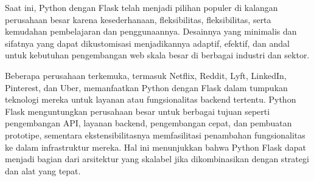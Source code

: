 \documentclass{article}
\begin{document}
Saat ini, Python dengan Flask telah menjadi pilihan populer di kalangan perusahaan besar karena kesederhanaan, fleksibilitas, fleksibilitas, serta kemudahan pembelajaran dan penggunaannya. Desainnya yang minimalis dan sifatnya yang dapat dikustomisasi menjadikannya adaptif, efektif, dan andal untuk kebutuhan pengembangan web skala besar di berbagai industri dan sektor.

Beberapa perusahaan terkemuka, termasuk Netflix, Reddit, Lyft, LinkedIn, Pinterest, dan Uber, memanfaatkan Python dengan Flask dalam tumpukan teknologi mereka untuk layanan atau fungsionalitas backend tertentu. Python Flask menguntungkan perusahaan besar untuk berbagai tujuan seperti pengembangan API, layanan backend, pengembangan cepat, dan pembuatan prototipe, sementara ekstensibilitasnya memfasilitasi penambahan fungsionalitas ke dalam infrastruktur mereka. Hal ini menunjukkan bahwa Python Flask dapat menjadi bagian dari arsitektur yang skalabel jika dikombinasikan dengan strategi dan alat yang tepat.
\end{document}
